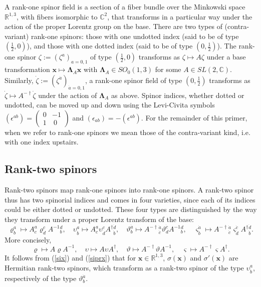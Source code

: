 \documentclass[11pt]{article}
\theoremstyle{definition}
\newcommand{\refeq}[1]{(\ref{#1})}
\numberwithin{equation}{section}
\newcommand{\bx}{\mathbf{x}}
\newcommand{\beq}{\begin{equation}}
\newcommand{\eeq}{\end{equation}}
\newcommand{\bLa}{\boldsymbol{\Lambda}}
\newcommand{\Cset}{{\mathbb C}}
\newcommand{\Rset}{{\mathbb R}}
\newcommand{\ep}{\epsilon}
\newcommand{\si}{\sigma}
\newcommand{\half}{\frac{1}{2}}
\begin{document}
 A rank-one spinor field is a section of a fiber bundle over the Minkowski space $\Rset^{1,3}$, with fibers isomorphic to $\Cset^2$, 
that transforms in a particular way under the action of the proper Lorentz group on the base.
  There are two types of (contra-variant) rank-one spinors: those with one undotted index (said to be of type $(\half,0)$), and those 
with one dotted index (said to be of type $(0,\half)$).
 The rank-one spinor $\zeta := (\zeta^a)_{a=0,1}$ of type $(\half,0)$ transforms as $\zeta \mapsto A\zeta$ 
under a base transformation $\bx \mapsto \bLa_A \bx$ with $\bLa_A \in SO_0(1,3)$ for some $A\in SL(2,\Cset)$.
 Similarly, $\dot\zeta := (\zeta^{\dot{a}})_{\dot{a}=0,1}$, a rank-one spinor field of type $(0,\half)$ 
transforms as $\dot\zeta \mapsto A^{-\dagger}\dot\zeta$ under the action of $\bLa_A$ as above.
 Spinor indices, whether dotted or undotted, can be moved up and down using the Levi-Civita symbols 
$(\ep^{ab}) = \left(\begin{array}{cc} 0 & -1\\ 1 & \ 0\end{array}\right)$ and $(\ep_{ab}) = -(\ep^{ab})$.
 For the remainder of this primer, when we refer to rank-one spinors we mean those of the contra-variant kind, i.e. with one index upstairs.


\subsection{Rank-two spinors}

 Rank-two spinors map rank-one spinors into rank-one spinors. 
 A rank-two spinor thus has two spinorial indices and comes in four varieties, since each of its indices could be either dotted or 
undotted. 
 These four types are distinguished by the way they transform under a proper Lorentz transform of the base: 
\beq 
\varrho^a_b 
 \mapsto  A^a_c \varrho^c_d A^{-1}{}^d_b, \quad
\upsilon^a_{\dot{b}} \mapsto  A^a_c \upsilon^c_{\dot{d}} A^\dag{}^{\dot{d}}_{\dot{b}}, \quad
\vartheta^{\dot{a}}_b \mapsto  A^{-\dag}{}^{\dot{a}}_{\dot{c}} \vartheta^{\dot{c}}_d A^{-1}{}^d_b, \quad
\varsigma^{\dot{a}}_{\dot{b}}  
\mapsto  A^{-\dag}{}^{\dot{a}}_{\dot{c}} \varsigma^{\dot{c}}_{\dot{d}} A^\dag{}^{\dot{d}}_{\dot{b}}.
\eeq
 More concisely,
\beq \label{transrules}
\varrho  \mapsto  A \varrho A^{-1}, \quad
\upsilon \mapsto  A \upsilon A^\dag{}, \quad
\vartheta \mapsto  A^{-\dag}\vartheta A^{-1}, \quad
\varsigma \mapsto  A^{-\dag}\varsigma A^\dag{}.
\eeq
 It follows from \refeq{six} and \refeq{siprx} that for $\bx\in\Rset^{1,3}$, $\si(\bx)$ and $\si'(\bx)$ are Hermitian rank-two spinors,
which transform as a rank-two spinor of the type $\upsilon^a_{\dot{b}}$, respectively 
of the type $\vartheta^{\dot{a}}_b$. 
\end{document}
